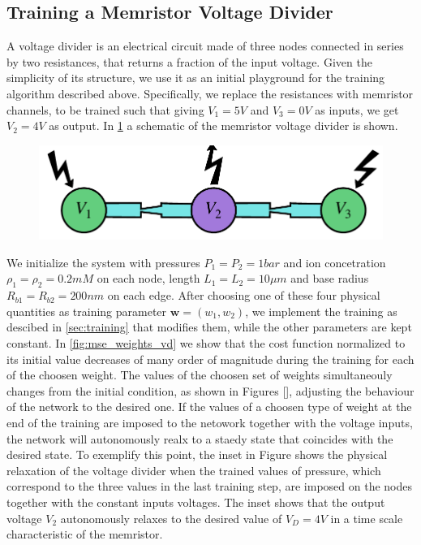 \documentclass[reprint,superscriptaddress,prb,showkeys]{revtex4-2}
\newcommand{\brac}[1]{\left(#1 \right)} %
\begin{document}
\subsection{\label{sec:train_memr_vd}Training a Memristor Voltage Divider}

A voltage divider is an electrical circuit made of three nodes connected in series by two resistances, that returns a fraction of the input voltage. Given the simplicity of its structure, we use it as an initial playground for the training algorithm described above. Specifically, we replace the resistances with memristor channels, to be trained such that giving $V_1 = 5V$ and $V_3 = 0V$ as inputs, we get $V_2 = 4V$ as output. In \cref{fig:vd_scheme} a schematic of the memristor voltage divider is shown.

\begin{figure}[h]
    \centering
    \includegraphics[width=0.8\columnwidth]{plots/voltage_divider/vd_scheme.pdf}
    \caption{}\label{fig:vd_scheme}
\end{figure} 

We initialize the system with pressures $P_1 =  P_2 = 1 bar$ and ion concetration $\rho_1 = \rho_2 = 0.2 mM$ on each node, length $L_1 = L_2 = 10\mu m$ and base radius  $R_{b1} = R_{b2} = 200 nm$ on each edge. After choosing one of these four physical quantities as training parameter $\boldsymbol{w} = \brac{w_1, w_2}$, we implement the training as descibed in \cref{sec:training} that modifies them, while the other parameters are kept constant. 
In \cref{fig:mse_weights_vd} we show that the cost function normalized to its initial value decreases of many order of magnitude during the training for each of the choosen weight. The values of the choosen set of weights simultaneouly changes from the initial condition, as shown in Figures [], adjusting the behaviour of the network to the desired one. If the values of a choosen type of weight at the end of the training are imposed to the netowork together with the voltage inputs, the network will autonomously realx to a staedy state that coincides with the desired state. To exemplify this point, the inset in Figure shows the physical relaxation of the voltage divider when the trained values of pressure, which correspond to the three values in the last training step, are imposed on the nodes together with the constant inputs voltages. The inset shows that the output voltage $V_2$ autonomously relaxes to the desired value of $V_D=4V$ in a time scale characteristic of the memristor.
\end{document}
